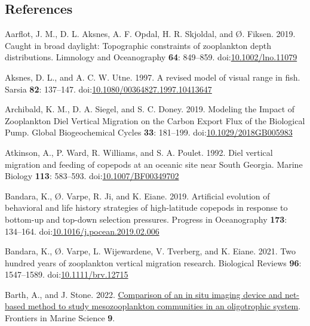 \documentclass[
]{article}
\newlength{\cslhangindent}
\newlength{\cslentryspacingunit} %
\newenvironment{CSLReferences}[2] %
 {%
  \setlength{\parindent}{0pt}
  \ifodd #1
  \let\oldpar\par
  \def\par{\hangindent=\cslhangindent\oldpar}
  \fi
  \setlength{\parskip}{#2\cslentryspacingunit}
 }%
 {}
\begin{document}
\hypertarget{references}{%
\subsection{References}\label{references}}

\hypertarget{refs}{}
\begin{CSLReferences}{1}{0}
\leavevmode{}%
Aarflot, J. M., D. L. Aksnes, A. F. Opdal, H. R. Skjoldal, and Ø.
Fiksen. 2019. Caught in broad daylight: Topographic constraints of
zooplankton depth distributions. Limnology and Oceanography \textbf{64}:
849--859.
doi:\href{https://doi.org/10.1002/lno.11079}{10.1002/lno.11079}

\leavevmode{}%
Aksnes, D. L., and A. C. W. Utne. 1997. A revised model of visual range
in fish. Sarsia \textbf{82}: 137--147.
doi:\href{https://doi.org/10.1080/00364827.1997.10413647}{10.1080/00364827.1997.10413647}

\leavevmode{}%
Archibald, K. M., D. A. Siegel, and S. C. Doney. 2019. Modeling the
Impact of Zooplankton Diel Vertical Migration on the Carbon Export Flux
of the Biological Pump. Global Biogeochemical Cycles \textbf{33}:
181--199.
doi:\href{https://doi.org/10.1029/2018GB005983}{10.1029/2018GB005983}

\leavevmode{}%
Atkinson, A., P. Ward, R. Williams, and S. A. Poulet. 1992. Diel
vertical migration and feeding of copepods at an oceanic site near South
Georgia. Marine Biology \textbf{113}: 583--593.
doi:\href{https://doi.org/10.1007/BF00349702}{10.1007/BF00349702}

\leavevmode{}%
Bandara, K., Ø. Varpe, R. Ji, and K. Eiane. 2019. Artificial evolution
of behavioral and life history strategies of high-latitude copepods in
response to bottom-up and top-down selection pressures. Progress in
Oceanography \textbf{173}: 134--164.
doi:\href{https://doi.org/10.1016/j.pocean.2019.02.006}{10.1016/j.pocean.2019.02.006}

\leavevmode{}%
Bandara, K., Ø. Varpe, L. Wijewardene, V. Tverberg, and K. Eiane. 2021.
Two hundred years of zooplankton vertical migration research. Biological
Reviews \textbf{96}: 1547--1589.
doi:\href{https://doi.org/10.1111/brv.12715}{10.1111/brv.12715}

\leavevmode{}%
Barth, A., and J. Stone. 2022.
\href{https://www.frontiersin.org/articles/10.3389/fmars.2022.898057}{Comparison
of an in situ imaging device and net-based method to study
mesozooplankton communities in an oligotrophic system}. Frontiers in
Marine Science \textbf{9}.


\end{CSLReferences}
\end{document}

